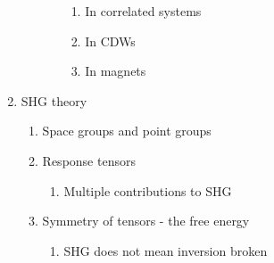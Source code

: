 \documentclass{article}
\begin{document}
\begin{enumerate}
\begin{enumerate}
\begin{enumerate}
            \begin{enumerate}
            \item In correlated systems
            \item In CDWs
            \item In magnets
            \end{enumerate}
        \end{enumerate}
    \end{enumerate}
\item SHG theory
    \begin{enumerate}
    \item Space groups and point groups
    \item Response tensors
        \begin{enumerate}
        \item Multiple contributions to SHG
        \end{enumerate}
    \item Symmetry of tensors - the free energy
        \begin{enumerate}
        \item SHG does not mean inversion broken

\end{enumerate}
\end{enumerate}
\end{enumerate}
\end{document}
